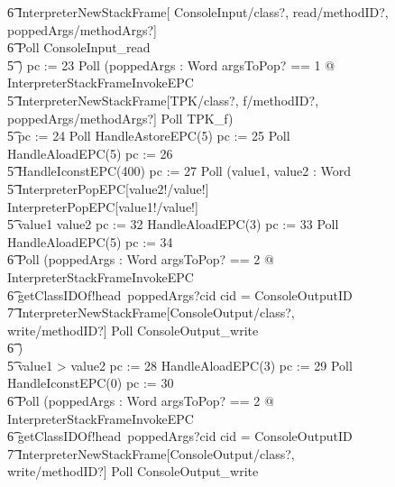 \begin{figure}[tp!]
{\begin{circus}
    \t6 \lschexpract InterpreterNewStackFrame[ ConsoleInput/class?, read/methodID?, poppedArgs/methodArgs?] \rschexpract \circseq \\
    \t6 Poll \circseq ConsoleInput\_read \\
    \t5 \circfi) \circseq pc := 23 \circseq Poll \circseq (\circvar poppedArgs : \seq Word \circspot \lschexpract \exists argsToPop? == 1 @ InterpreterStackFrameInvokeEPC \rschexpract \circseq \\
    \t5 \lschexpract InterpreterNewStackFrame[TPK/class?, f/methodID?, poppedArgs/methodArgs?] \rschexpract \circseq Poll \circseq TPK\_f) \circseq \\
    \t5 pc := 24 \circseq Poll \circseq HandleAstoreEPC(5) \circseq pc := 25 \circseq Poll \circseq HandleAloadEPC(5) \circseq pc := 26 \circseq \\
    \t5 HandleIconstEPC(400) \circseq pc := 27 \circseq Poll \circseq (\circvar value1, value2 : Word \circspot \\
    \t5 \lschexpract InterpreterPopEPC[value2!/value!] \rschexpract \circseq \lschexpract InterpreterPopEPC[value1!/value!] \rschexpract \circseq \\
    \t5 \circif value1 \leq value2 \circthen pc := 32 \circseq HandleAloadEPC(3) \circseq pc := 33 \circseq Poll \circseq HandleAloadEPC(5) \circseq pc := 34 \circseq \\
    \t6 Poll \circseq (\circvar poppedArgs : Word \circspot \lschexpract \exists argsToPop? == 2 @ InterpreterStackFrameInvokeEPC \rschexpract \circseq \\
    \t6 getClassIDOf!head~poppedArgs?cid \then \circif cid = ConsoleOutputID \circthen {} \\
    \t7 \lschexpract InterpreterNewStackFrame[ConsoleOutput/class?, write/methodID?] \rschexpract \circseq  Poll \circseq ConsoleOutput\_write \\
    \t6 \circfi) \\
    \t5 {} \circelse value1 > value2 \circthen pc := 28 \circseq HandleAloadEPC(3) \circseq pc := 29 \circseq Poll \circseq HandleIconstEPC(0) \circseq pc := 30 \circseq \\
    \t6 Poll \circseq (\circvar poppedArgs : Word \circspot \lschexpract \exists argsToPop? == 2 @ InterpreterStackFrameInvokeEPC \rschexpract \circseq \\
    \t6 getClassIDOf!head~poppedArgs?cid \then \circif cid = ConsoleOutputID \circthen {} \\
    \t7 \lschexpract InterpreterNewStackFrame[ConsoleOutput/class?, write/methodID?] \rschexpract \circseq  Poll \circseq ConsoleOutput\_write \\

\end{circus}}
\end{figure}
